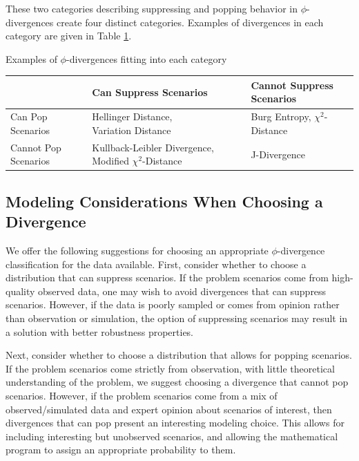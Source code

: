 \documentclass[ijoc,letterpaper]{informs3} %
\begin{document}
\noindent These two categories describing suppressing and popping behavior in $\phi$-divergences create four distinct categories.
Examples of divergences in each category are given in Table \ref{tb:phi_categories}.

\begin{table}
	\TABLE
	{
		Examples of $\phi$-divergences fitting into each category
		\label{tb:phi_categories}
	}
	{\begin{tabular}{l|p{}p{}}
		 & Can Suppress Scenarios & Cannot Suppress Scenarios \\
		 \hline
		 Can Pop Scenarios %
			& \parbox{.33\textwidth}{Hellinger Distance,\\Variation Distance} %
			& \parbox{.33\textwidth}{Burg Entropy,\\$\chi^2$-Distance} \smallskip \\
		 Cannot Pop Scenarios %
			& \parbox{.33\textwidth}{Kullback-Leibler Divergence,\\Modified $\chi^2$-Distance} %
			& \parbox{.33\textwidth}{J-Divergence}
	\end{tabular}}
	{}
\end{table}

\subsection{Modeling Considerations When Choosing a Divergence}
\label{ssec:modeling}

We offer the following suggestions for choosing an appropriate $\phi$-divergence classification for the data available.
First, consider whether to choose a distribution that can suppress scenarios.
If the problem scenarios come from high-quality observed data, one may wish to avoid divergences that can suppress scenarios.
However, if the data is poorly sampled or comes from opinion rather than observation or simulation, the option of suppressing scenarios may result in a solution with better robustness properties.

Next, consider whether to choose a distribution that allows for popping scenarios.
If the problem scenarios come strictly from observation, with little theoretical understanding of the problem, we suggest choosing a divergence that cannot pop scenarios.
However, if the problem scenarios come from a mix of observed/simulated data and expert opinion about scenarios of interest, then divergences that can pop present an interesting modeling choice.
This allows for including interesting but unobserved scenarios, and allowing the mathematical program to assign an appropriate probability to them.
\end{document}
